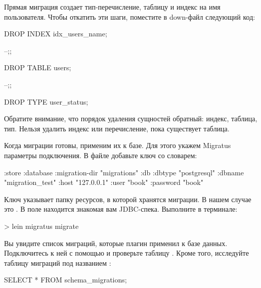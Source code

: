 Прямая миграция создает тип-перечисление, таблицу  и индекс на имя пользователя. Чтобы откатить эти шаги, поместите в down-файл следующий код:

\begin{english}
  \begin{sql}
DROP INDEX idx_users_name;

--;;

DROP TABLE users;

--;;

DROP TYPE user_status;
  \end{sql}
\end{english}

Обратите внимание, что порядок удаления сущностей обратный: индекс, таблица, тип. Нельзя удалить индекс или перечисление, пока существует таблица.

Когда миграции готовы, применим их к базе. Для этого укажем Migratus параметры подключения. В файле  добавьте ключ  со словарем:

\begin{english}
  \begin{clojure}
{:store :database
 :migration-dir "migrations"
 :db {:dbtype "postgresql"
      :dbname "migration_test"
      :host "127.0.0.1"
      :user "book"
      :password "book"}}
  \end{clojure}
\end{english}

Ключ  указывает папку ресурсов, в которой хранятся миграции. В нашем случае это . В поле  находится знакомая вам JDBC-спека. Выполните в терминале:

\begin{english}
  \begin{bash}
> lein migratus migrate
  \end{bash}
\end{english}

Вы увидите список миграций, которые плагин применил к базе данных. Подключитесь к ней с помощью  и проверьте таблицу . Кроме того, исследуйте таблицу миграций под названием :

\begin{english}
  \begin{clojure}
SELECT * FROM schema_migrations;
  \end{clojure}
\end{english}

